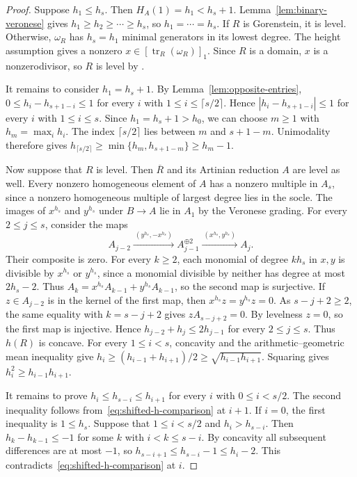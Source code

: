 \documentclass[a4paper,11pt]{amsart}
\DeclareMathOperator{\tr}{tr}
\theoremstyle{definition}
\begin{document}
\begin{proof}
Suppose $h_1\leq h_s$. Then $H_A(1)=h_1<h_s+1$. Lemma~\ref{lem:binary-veronese} gives $h_1\geq h_2\geq\cdots\geq h_s$, so $h_1=\cdots=h_s$. If $R$ is Gorenstein, it is level. Otherwise, $\omega_R$ has $h_s=h_1$ minimal generators in its lowest degree. The height assumption gives a nonzero $x\in[\tr_R(\omega_R)]_1$. Since $R$ is a domain, $x$ is a nonzerodivisor, so $R$ is level by \cite[Proposition~4.4~(2)]{MO}.

It remains to consider $h_1=h_s+1$. By Lemma~\ref{lem:opposite-entries}, $0\leq h_i-h_{s+1-i}\leq1$ for every $i$ with $1\leq i\leq\lceil s/2\rceil$. Hence $|h_i-h_{s+1-i}|\leq1$ for every $i$ with $1\leq i\leq s$. Since $h_1=h_s+1>h_0$, we can choose $m\geq1$ with $h_m=\max_i h_i$. The index $\lceil s/2\rceil$ lies between $m$ and $s+1-m$. Unimodality therefore gives $h_{\lceil s/2\rceil}\geq\min\{h_m,h_{s+1-m}\}\geq h_m-1$.

Now suppose that $R$ is level. Then $\overline R$ and its Artinian reduction $A$ are level as well. Every nonzero homogeneous element of $A$ has a nonzero multiple in $A_s$, since a nonzero homogeneous multiple of largest degree lies in the socle. The images of $x^{h_s}$ and $y^{h_s}$ under $B\to A$ lie in $A_1$ by the Veronese grading. For every $2\leq j\leq s$, consider the maps
\[
 A_{j-2}\xrightarrow{\ (y^{h_s},-x^{h_s})\ }A_{j-1}^{\oplus2}\xrightarrow{\ (x^{h_s},y^{h_s})\ }A_j .
\]
Their composite is zero. For every $k\geq2$, each monomial of degree $k h_s$ in $x,y$ is divisible by $x^{h_s}$ or $y^{h_s}$, since a monomial divisible by neither has degree at most $2h_s-2$. Thus $A_k=x^{h_s}A_{k-1}+y^{h_s}A_{k-1}$, so the second map is surjective. If $z\in A_{j-2}$ is in the kernel of the first map, then $x^{h_s}z=y^{h_s}z=0$. As $s-j+2\geq2$, the same equality with $k=s-j+2$ gives $z A_{s-j+2}=0$. By levelness $z=0$, so the first map is injective. Hence $h_{j-2}+h_j\leq2h_{j-1}$ for every $2\leq j\leq s$. Thus $h(R)$ is concave. For every $1\leq i<s$, concavity and the arithmetic--geometric mean inequality give $h_i\geq(h_{i-1}+h_{i+1})/2\geq\sqrt{h_{i-1}h_{i+1}}$. Squaring gives $h_i^2\geq h_{i-1}h_{i+1}$.

It remains to prove $h_i\leq h_{s-i}\leq h_{i+1}$ for every $i$ with $0\leq i<s/2$. The second inequality follows from~\eqref{eq:shifted-h-comparison} at $i+1$. If $i=0$, the first inequality is $1\leq h_s$. Suppose that $1\leq i<s/2$ and $h_i>h_{s-i}$. Then $h_k-h_{k-1}\leq-1$ for some $k$ with $i<k\leq s-i$. By concavity all subsequent differences are at most $-1$, so $h_{s-i+1}\leq h_{s-i}-1\leq h_i-2$. This contradicts~\eqref{eq:shifted-h-comparison} at $i$.
\end{proof}
\end{document}
